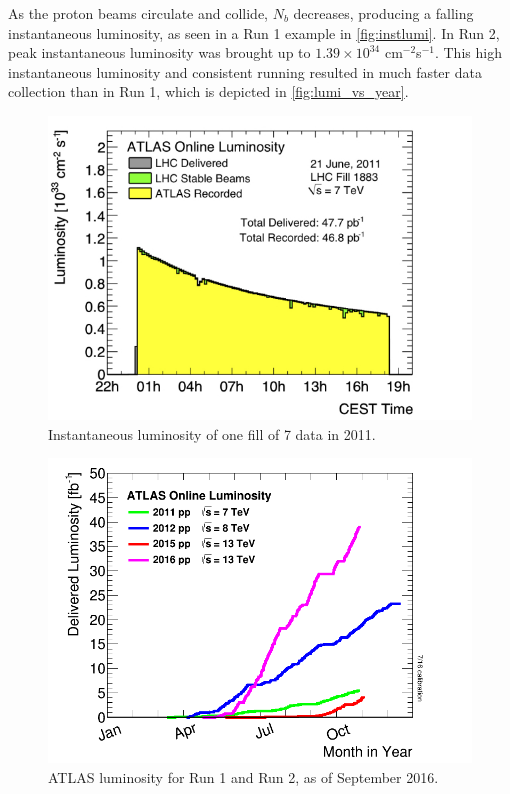 As the proton beams circulate and collide, $N_b$ decreases, producing a falling instantaneous luminosity, as seen in a Run 1 example in \autoref{fig:instlumi}. In Run 2, peak instantaneous luminosity was brought up to $1.39 \times 10^{34}$ cm$^{-2}$s$^{-1}$. This high instantaneous luminosity and consistent running resulted in much faster data collection than in Run 1, which is depicted in \autoref{fig:lumi_vs_year}. 

\begin{centering}
\begin{figure}[!hbt]
\myfloatalign
\includegraphics[width=.90\linewidth]{figures/lhc/lumi1883.jpg}
\caption{Instantaneous luminosity of one fill of 7 \tev data in 2011.}
\label{fig:instlumi}
\end{figure}
\end{centering}

\begin{centering}
\begin{figure}[!hbt]
\myfloatalign
\includegraphics[width=.90\linewidth]{figures/lhc/intlumivsyear.png}
\caption{\ac{ATLAS} luminosity for Run 1 and Run 2, as of September 2016.}
\label{fig:lumi_vs_year}
\end{figure} 
\end{centering}

